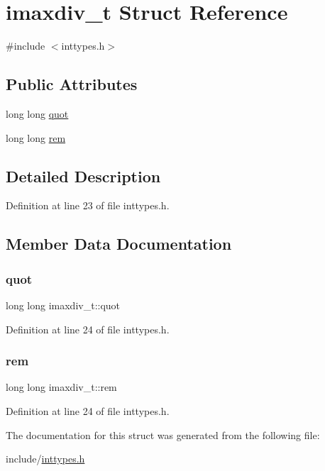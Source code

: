 \hypertarget{structimaxdiv__t}{}\section{imaxdiv\+\_\+t Struct Reference}
\label{structimaxdiv__t}


{\ttfamily \#include $<$inttypes.\+h$>$}

\subsection*{Public Attributes}
\begin{DoxyCompactItemize}
\item 
long long \mbox{\hyperlink{structimaxdiv__t_ab634360de4d8a0f31cb1586fa63ad94a}{quot}}
\item 
long long \mbox{\hyperlink{structimaxdiv__t_af4a6c40dfaf2409cc44d20abf613d915}{rem}}
\end{DoxyCompactItemize}


\subsection{Detailed Description}


Definition at line 23 of file inttypes.\+h.



\subsection{Member Data Documentation}
\mbox{\label{structimaxdiv__t_ab634360de4d8a0f31cb1586fa63ad94a}} 
\subsubsection{\texorpdfstring{quot}{quot}}
{\footnotesize\ttfamily long long imaxdiv\+\_\+t\+::quot}



Definition at line 24 of file inttypes.\+h.

\mbox{\label{structimaxdiv__t_af4a6c40dfaf2409cc44d20abf613d915}} 
\subsubsection{\texorpdfstring{rem}{rem}}
{\footnotesize\ttfamily long long imaxdiv\+\_\+t\+::rem}



Definition at line 24 of file inttypes.\+h.



The documentation for this struct was generated from the following file\+:\begin{DoxyCompactItemize}
\item 
include/\mbox{\hyperlink{inttypes_8h}{inttypes.\+h}}\end{DoxyCompactItemize}
